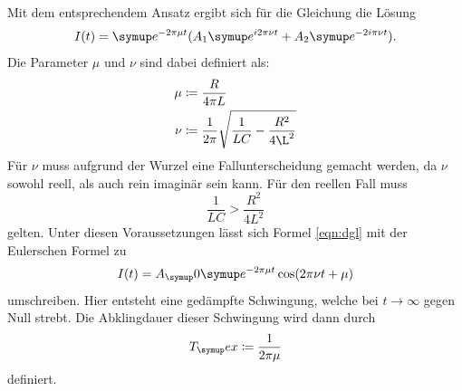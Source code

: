 Mit dem entsprechendem Ansatz ergibt sich für die Gleichung die Lösung
\begin{equation}
  I(t)=\su{e}^{-2\pi\mu t}(A_1\su{e}^{i2\pi\nu t} + A_2\su{e}^{-2i\pi\nu t}).
  \label{eqn:dgl}
\end{equation}
Die Parameter $\mu$ und $\nu$ sind dabei definiert als:
\begin{align}
  \mu &\coloneqq\frac{R}{4\pi L}\label{eqn:reff} \\
  \nu &\coloneqq\frac{1}{2\pi}\sqrt{\frac{1}{LC}-\frac{R^2}{4\L^2}}
\end{align}
Für $\nu$ muss aufgrund der Wurzel eine Fallunterscheidung gemacht werden, da
$\nu$ sowohl reell, als auch rein imaginär sein kann.
Für den reellen Fall muss
\begin{equation*}
  \frac{1}{LC} > \frac{R^2}{4L^2}
\end{equation*}
gelten. Unter diesen Voraussetzungen lässt sich Formel \eqref{eqn:dgl} mit der
Eulerschen Formel zu
\begin{equation}
  I(t)=A_\su{0}\su{e}^{-2\pi\mu t}\cos(2\pi\nu t+\mu)
  \label{eqn:einh}
\end{equation}
umschreiben. Hier entsteht eine gedämpfte Schwingung, welche bei
$t\rightarrow\infty$
gegen Null strebt. Die Abklingdauer dieser Schwingung wird dann durch
\begin{equation}
  T_\su{ex}\coloneqq\frac{1}{2\pi\mu} \label{eqn:tex}
\end{equation}
definiert.

